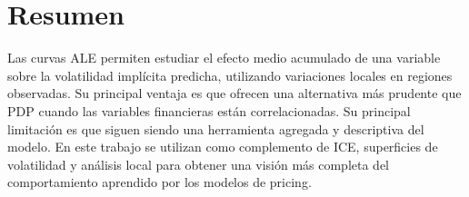 \section*{Resumen}

Las curvas ALE permiten estudiar el efecto medio acumulado de una variable sobre la volatilidad implícita predicha, utilizando variaciones locales en regiones observadas. Su principal ventaja es que ofrecen una alternativa más prudente que PDP cuando las variables financieras están correlacionadas. Su principal limitación es que siguen siendo una herramienta agregada y descriptiva del modelo. En este trabajo se utilizan como complemento de ICE, superficies de volatilidad y análisis local para obtener una visión más completa del comportamiento aprendido por los modelos de pricing.
